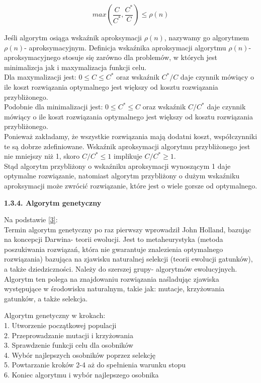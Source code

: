 \documentclass[a4paper, twoside, 12pt, justified]{article}
\begin{document}
	\begin{equation}
		max \left(\frac{C}{C^*}, \frac{C^*}{C}\right) \leq \rho(n) 
	\end{equation}
	
	Jeśli algorytm osiąga wskaźnik aproksymacji $\rho(n)$, nazywamy go algorytmem $\rho(n)$- aproksymacyjnym. Definicja wskaźnika aproksymacji algorytmu $\rho(n)$- aproksymacyjnego stosuje się zarówno dla problemów, w których jest minimalizcja jak i maxymalizacja funkcji celu.\\
	Dla maxymalizacji jest: $0 \le C \leq C^*$ oraz wskaźnik $C^*/C$ daje czynnik mówiący o ile koszt rozwiązania optymalnego jest większy od kosztu rozwiązania przybliżonego.\\
	Podobnie dla minimalizacji jest: $0 \le C^* \leq C$ oraz wskaźnik $C/C^*$ daje czynnik mówiący o ile koszt rozwiązania optymalnego jest większy od kosztu rozwiązania przybliżonego.\\
	Ponieważ zakładamy, że wszystkie rozwiązania mają dodatni koszt, współczynniki te są dobrze zdefiniowane. Wskaźnik aproksymacji algorytmu przybliżonego jest nie mniejszy niż 1, skoro $C/C^* \leq 1$ implikuje $C/C^* \geq 1$.\\
	Stąd algorytm przybliżony o wskaźniku aproksymacji wynoszącym 1 daje optymalne rozwiązanie, natomiast algorytm przybliżony o dużym wskaźniku aproksymacji może zwrócić rozwiązanie, które jest o wiele gorsze od optymalnego.\\
	
	\newpage
	
	\begin{large}
		\textbf{1.3.4. Algorytm genetyczny}
	\end{large}
	\vspace{5mm} %
	
	Na podstawie \hyperlink{ag}{[3]}:\\
	Termin algorytm genetyczny po raz pierwszy wprowadził John Holland, bazując na koncepcji Darwina- teorii ewolucji. Jest to metaheurystyka (metoda poszukiwania rozwiązań, która nie gwarantuje znalezienia optymalnego rozwiązania) bazująca na zjawisku naturalnej selekcji (teorii ewolucji gatunków), a także dziedziczności. Należy do szerszej grupy- algorytmów ewolucyjnych. Algorytm ten polega na znajdowaniu rozwiązania naśladując zjawiska występujące w środowisku naturalnym, takie jak: mutacje, krzyżowania gatunków, a także selekcja. \newpage
	
	Algorytm genetyczny w krokach:\\
	1. Utworzenie początkowej populacji\\
	2. Przeprowadzanie mutacji i krzyżowania\\
	3. Sprawdzenie funkcji celu dla osobników\\
	4. Wybór najlepszych osobników poprzez selekcję\\
	5. Powtarzanie kroków 2-4 aż do spełnienia warunku stopu\\
	6. Koniec algorytmu i wybór najlepszego osobnika
	
\end{document}
